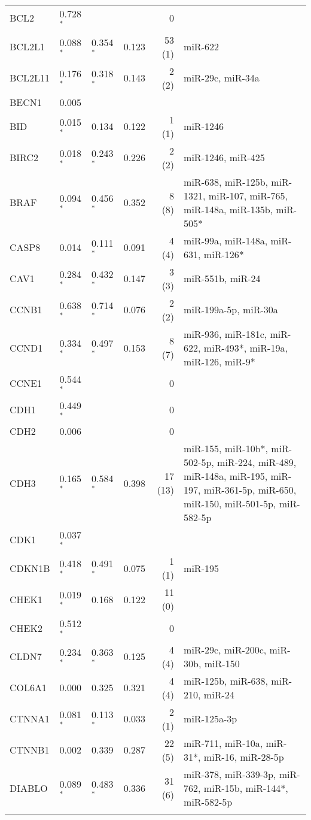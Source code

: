 {{\begin{longtable}{llllrp{7cm}}
BCL2&0.728$^{\ast}$&&&0&\raggedright{} \tabularnewline\rowcolor[rgb]{0.96,0.96,0.96}{}%
BCL2L1&0.088$^{\ast}$&0.354$^{\ast}$&0.123&53 (1)&\raggedright{miR-622} \tabularnewline{}%
BCL2L11&0.176$^{\ast}$&0.318$^{\ast}$&0.143&2 (2)&\raggedright{miR-29c, miR-34a} \tabularnewline\rowcolor[rgb]{0.96,0.96,0.96}{}%
BECN1&0.005&&&&\raggedright{} \tabularnewline{}%
BID&0.015$^{\ast}$&0.134&0.122&1 (1)&\raggedright{miR-1246} \tabularnewline\rowcolor[rgb]{0.96,0.96,0.96}{}%
BIRC2&0.018$^{\ast}$&0.243$^{\ast}$&0.226&2 (2)&\raggedright{miR-1246, miR-425} \tabularnewline{}%
BRAF&0.094$^{\ast}$&0.456$^{\ast}$&0.352&8 (8)&\raggedright{miR-638, miR-125b, miR-1321, miR-107, miR-765, miR-148a, miR-135b, miR-505*} \tabularnewline\rowcolor[rgb]{0.96,0.96,0.96}{}%
CASP8&0.014&0.111$^{\ast}$&0.091&4 (4)&\raggedright{miR-99a, miR-148a, miR-631, miR-126*} \tabularnewline{}%
CAV1&0.284$^{\ast}$&0.432$^{\ast}$&0.147&3 (3)&\raggedright{miR-551b, miR-24} \tabularnewline\rowcolor[rgb]{0.96,0.96,0.96}{}%
CCNB1&0.638$^{\ast}$&0.714$^{\ast}$&0.076&2 (2)&\raggedright{miR-199a-5p, miR-30a} \tabularnewline{}%
CCND1&0.334$^{\ast}$&0.497$^{\ast}$&0.153&8 (7)&\raggedright{miR-936, miR-181c, miR-622, miR-493*, miR-19a, miR-126, miR-9*} \tabularnewline\rowcolor[rgb]{0.96,0.96,0.96}{}%
CCNE1&0.544$^{\ast}$&&&0&\raggedright{} \tabularnewline{}%
CDH1&0.449$^{\ast}$&&&0&\raggedright{} \tabularnewline\rowcolor[rgb]{0.96,0.96,0.96}{}%
CDH2&0.006&&&0&\raggedright{} \tabularnewline{}%
CDH3&0.165$^{\ast}$&0.584$^{\ast}$&0.398&17 (13)&\raggedright{miR-155, miR-10b*, miR-502-5p, miR-224, miR-489, miR-148a, miR-195, miR-197, miR-361-5p, miR-650, miR-150, miR-501-5p, miR-582-5p} \tabularnewline\rowcolor[rgb]{0.96,0.96,0.96}{}%
CDK1&0.037$^{\ast}$&&&&\raggedright{} \tabularnewline{}%
CDKN1B&0.418$^{\ast}$&0.491$^{\ast}$&0.075&1 (1)&\raggedright{miR-195} \tabularnewline\rowcolor[rgb]{0.96,0.96,0.96}{}%
CHEK1&0.019$^{\ast}$&0.168&0.122&11 (0)&\raggedright{} \tabularnewline{}%
CHEK2&0.512$^{\ast}$&&&0&\raggedright{} \tabularnewline\rowcolor[rgb]{0.96,0.96,0.96}{}%
CLDN7&0.234$^{\ast}$&0.363$^{\ast}$&0.125&4 (4)&\raggedright{miR-29c, miR-200c, miR-30b, miR-150} \tabularnewline{}%
COL6A1&0.000&0.325&0.321&4 (4)&\raggedright{miR-125b, miR-638, miR-210, miR-24} \tabularnewline\rowcolor[rgb]{0.96,0.96,0.96}{}%
CTNNA1&0.081$^{\ast}$&0.113$^{\ast}$&0.033&2 (1)&\raggedright{miR-125a-3p} \tabularnewline{}%
CTNNB1&0.002&0.339&0.287&22 (5)&\raggedright{miR-711, miR-10a, miR-31*, miR-16, miR-28-5p} \tabularnewline\rowcolor[rgb]{0.96,0.96,0.96}{}%
DIABLO&0.089$^{\ast}$&0.483$^{\ast}$&0.336&31 (6)&\raggedright{miR-378, miR-339-3p, miR-762, miR-15b, miR-144*, miR-582-5p} \tabularnewline{}%

\end{longtable}}}
